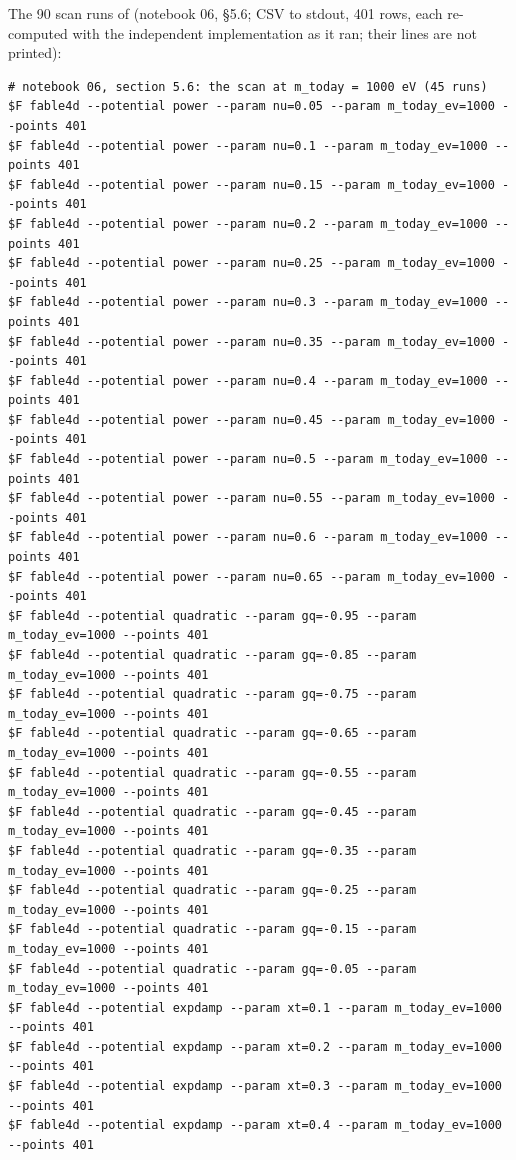 The 90 scan runs of  (notebook 06, \S5.6; CSV to stdout, 401 rows, each re-computed with the
independent implementation as it ran; their  lines are not printed):
\begin{Verbatim}[fontsize=\scriptsize]
# notebook 06, section 5.6: the scan at m_today = 1000 eV (45 runs)
$F fable4d --potential power --param nu=0.05 --param m_today_ev=1000 --points 401
$F fable4d --potential power --param nu=0.1 --param m_today_ev=1000 --points 401
$F fable4d --potential power --param nu=0.15 --param m_today_ev=1000 --points 401
$F fable4d --potential power --param nu=0.2 --param m_today_ev=1000 --points 401
$F fable4d --potential power --param nu=0.25 --param m_today_ev=1000 --points 401
$F fable4d --potential power --param nu=0.3 --param m_today_ev=1000 --points 401
$F fable4d --potential power --param nu=0.35 --param m_today_ev=1000 --points 401
$F fable4d --potential power --param nu=0.4 --param m_today_ev=1000 --points 401
$F fable4d --potential power --param nu=0.45 --param m_today_ev=1000 --points 401
$F fable4d --potential power --param nu=0.5 --param m_today_ev=1000 --points 401
$F fable4d --potential power --param nu=0.55 --param m_today_ev=1000 --points 401
$F fable4d --potential power --param nu=0.6 --param m_today_ev=1000 --points 401
$F fable4d --potential power --param nu=0.65 --param m_today_ev=1000 --points 401
$F fable4d --potential quadratic --param gq=-0.95 --param m_today_ev=1000 --points 401
$F fable4d --potential quadratic --param gq=-0.85 --param m_today_ev=1000 --points 401
$F fable4d --potential quadratic --param gq=-0.75 --param m_today_ev=1000 --points 401
$F fable4d --potential quadratic --param gq=-0.65 --param m_today_ev=1000 --points 401
$F fable4d --potential quadratic --param gq=-0.55 --param m_today_ev=1000 --points 401
$F fable4d --potential quadratic --param gq=-0.45 --param m_today_ev=1000 --points 401
$F fable4d --potential quadratic --param gq=-0.35 --param m_today_ev=1000 --points 401
$F fable4d --potential quadratic --param gq=-0.25 --param m_today_ev=1000 --points 401
$F fable4d --potential quadratic --param gq=-0.15 --param m_today_ev=1000 --points 401
$F fable4d --potential quadratic --param gq=-0.05 --param m_today_ev=1000 --points 401
$F fable4d --potential expdamp --param xt=0.1 --param m_today_ev=1000 --points 401
$F fable4d --potential expdamp --param xt=0.2 --param m_today_ev=1000 --points 401
$F fable4d --potential expdamp --param xt=0.3 --param m_today_ev=1000 --points 401
$F fable4d --potential expdamp --param xt=0.4 --param m_today_ev=1000 --points 401

\end{Verbatim}
